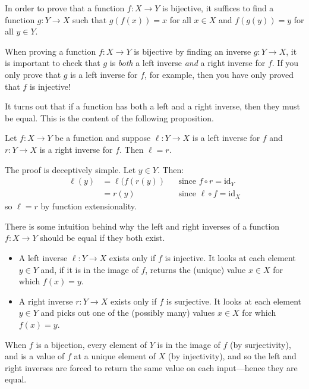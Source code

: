 \begin{strategy}
In order to prove that a function $f : X \to Y$ is bijective, it suffices to find a function $g : Y \to X$ such that $g(f(x)) = x$ for all $x \in X$ and $f(g(y)) = y$ for all $y \in Y$.
\end{strategy}

When proving a function $f : X \to Y$ is bijective by finding an inverse $g : Y \to X$, it is important to check that $g$ is \textit{both} a left inverse \textit{and} a right inverse for $f$. If you only prove that $g$ is a left inverse for $f$, for example, then you have only proved that $f$ is injective!

It turns out that if a function has both a left and a right inverse, then they must be equal. This is the content of the following proposition.

\begin{proposition}
\label{propLeftAndRightInversesAreEqual}
Let $f : X \to Y$ be a function and suppose $\ell : Y \to X$ is a left inverse for $f$ and $r : Y \to X$ is a right inverse for $f$. Then $\ell=r$.
\end{proposition}
\begin{cproof}
The proof is deceptively simple. Let $y \in Y$. Then:
\begin{align*}
\ell(y) &= \ell(f(r(y)) && \text{since } f \circ r = \mathrm{id}_Y \\
&= r(y) && \text{since } \ell \circ f = \mathrm{id}_X
\end{align*}
so $\ell = r$ by function extensionality.
\end{cproof}

There is some intuition behind why the left and right inverses of a function $f : X \to Y$ should be equal if they both exist.
\begin{itemize}
\item A left inverse $\ell : Y \to X$ exists only if $f$ is injective. It looks at each element $y \in Y$ and, if it is in the image of $f$, returns the (unique) value $x \in X$ for which $f(x)=y$.
\item A right inverse $r : Y \to X$ exists only if $f$ is surjective. It looks at each element $y \in Y$ and picks out one of the (possibly many) values $x \in X$ for which $f(x)=y$.
\end{itemize}
When $f$ is a bijection, every element of $Y$ is in the image of $f$ (by surjectivity), and is a value of $f$ at a unique element of $X$ (by injectivity), and so the left and right inverses are forced to return the same value on each input---hence they are equal.

